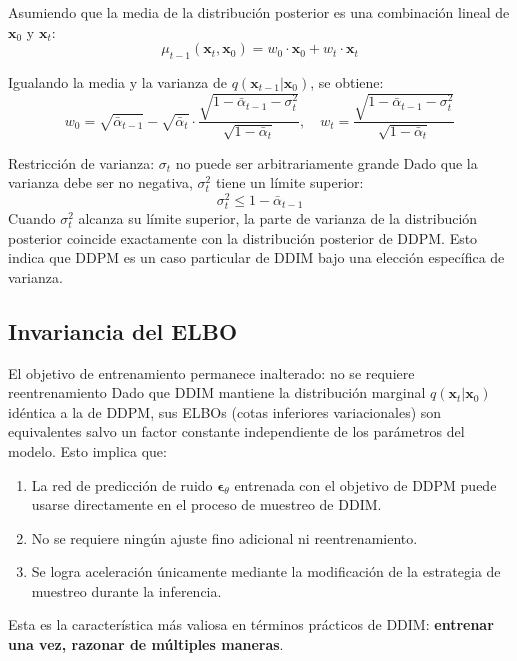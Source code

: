 \documentclass[a4paper]{article}
\begin{document}
Asumiendo que la media de la distribución posterior es una combinación lineal de $\mathbf{x}_0$ y $\mathbf{x}_t$:
$$
\mu_{t-1}(\mathbf{x}_t, \mathbf{x}_0) = w_0 \cdot \mathbf{x}_0 + w_t \cdot \mathbf{x}_t
$$

Igualando la media y la varianza de $q(\mathbf{x}_{t-1}|\mathbf{x}_0)$, se obtiene:
$$
w_0 = \sqrt{\bar{\alpha}_{t-1}} - \sqrt{\bar{\alpha}_t} \cdot \frac{\sqrt{1-\bar{\alpha}_{t-1}-\sigma_t^2}}{\sqrt{1-\bar{\alpha}_t}}, \quad
w_t = \frac{\sqrt{1-\bar{\alpha}_{t-1}-\sigma_t^2}}{\sqrt{1-\bar{\alpha}_t}}
$$

\begin{warningbox}{Restricción de varianza: $\sigma_t$ no puede ser arbitrariamente grande}
Dado que la varianza debe ser no negativa, $\sigma_t^2$ tiene un límite superior:
$$
\sigma_t^2 \leq 1 - \bar{\alpha}_{t-1}
$$
Cuando $\sigma_t^2$ alcanza su límite superior, la parte de varianza de la distribución posterior coincide exactamente con la distribución posterior de DDPM. Esto indica que DDPM es un caso particular de DDIM bajo una elección específica de varianza.
\end{warningbox}

\subsection{Invariancia del ELBO}

\begin{importantbox}{El objetivo de entrenamiento permanece inalterado: no se requiere reentrenamiento}
Dado que DDIM mantiene la distribución marginal $q(\mathbf{x}_t|\mathbf{x}_0)$ idéntica a la de DDPM, sus ELBOs (cotas inferiores variacionales) son equivalentes salvo un factor constante independiente de los parámetros del modelo. Esto implica que:
\begin{enumerate}
    \item La red de predicción de ruido $\boldsymbol{\epsilon}_\theta$ entrenada con el objetivo de DDPM puede usarse directamente en el proceso de muestreo de DDIM.
    \item No se requiere ningún ajuste fino adicional ni reentrenamiento.
    \item Se logra aceleración únicamente mediante la modificación de la estrategia de muestreo durante la inferencia.
\end{enumerate}
Esta es la característica más valiosa en términos prácticos de DDIM: \textbf{entrenar una vez, razonar de múltiples maneras}.
\end{importantbox}
\end{document}

